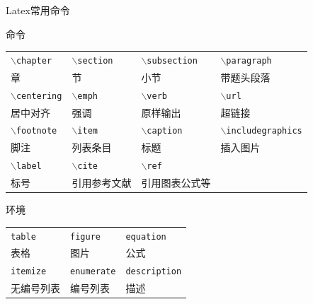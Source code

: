 \documentclass{beamer}
\def\cmd#1{\texttt{\color{red}\footnotesize $\backslash$#1}}
\def\env#1{\texttt{\color{blue}\footnotesize #1}}
\begin{document}
\begin{frame}[fragile]{Latex常用命令}
    \begin{exampleblock}{命令}
        \centering
        \footnotesize
        \begin{tabular}{llll}
            \cmd{chapter} & \cmd{section} & \cmd{subsection} & \cmd{paragraph} \\
            章 & 节 & 小节 & 带题头段落 \\\hline
            \cmd{centering} & \cmd{emph} & \cmd{verb} & \cmd{url} \\
            居中对齐 & 强调 & 原样输出 & 超链接 \\\hline
            \cmd{footnote} & \cmd{item} & \cmd{caption} & \cmd{includegraphics} \\
            脚注 & 列表条目 & 标题 & 插入图片 \\\hline
            \cmd{label} & \cmd{cite} & \cmd{ref} \\
            标号 & 引用参考文献 & 引用图表公式等\\\hline
        \end{tabular}
    \end{exampleblock}
    \begin{exampleblock}{环境}
        \centering
        \footnotesize
        \begin{tabular}{lll}
            \env{table} & \env{figure} & \env{equation}\\
            表格 & 图片 & 公式 \\\hline
            \env{itemize} & \env{enumerate} & \env{description}\\
            无编号列表 & 编号列表 & 描述 \\\hline
        \end{tabular}
    \end{exampleblock}
\end{frame}
\end{document}
